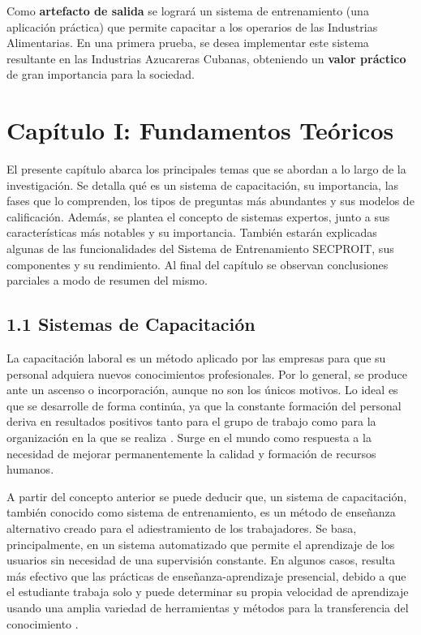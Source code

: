 \documentclass[12pt,a4paper]{report}
\begin{document}
Como \textbf{artefacto de salida} se logrará un sistema de entrenamiento (una aplicación práctica) que permite capacitar a los operarios de las Industrias Alimentarias. En una primera prueba, se desea implementar este sistema resultante en las Industrias Azucareras Cubanas, obteniendo un \textbf{valor práctico} de gran importancia para la sociedad.

\chapter*{Capítulo I: Fundamentos Teóricos}
El presente capítulo abarca los principales temas que se abordan a lo largo de la investigación. Se detalla qué es un sistema de capacitación, su importancia, las fases que lo comprenden, los tipos de preguntas más abundantes y sus modelos de calificación. Además, se plantea el concepto de sistemas expertos, junto a sus características más notables y su importancia. También estarán explicadas algunas de las funcionalidades del Sistema de Entrenamiento SECPROIT, sus componentes y su rendimiento.
Al final del capítulo se observan conclusiones parciales a modo de resumen del mismo.

\section*{1.1 Sistemas de Capacitación}
La capacitación laboral es un método aplicado por las empresas para que su personal adquiera nuevos conocimientos profesionales. Por lo general, se produce ante un ascenso o incorporación, aunque no son los únicos motivos. Lo ideal es que se desarrolle de forma continúa, ya que la constante formación del personal deriva en resultados positivos tanto para el grupo de trabajo como para la organización en la que se realiza \cite{blogBizneo}.
Surge en el mundo como respuesta a la necesidad de mejorar permanentemente la calidad y formación de recursos humanos.

A partir del concepto anterior se puede deducir que, un sistema de capacitación, también conocido como sistema de entrenamiento, es un método de enseñanza alternativo creado para el adiestramiento de los trabajadores. Se basa, principalmente, en un sistema automatizado que permite el aprendizaje de los usuarios sin necesidad de una supervisión constante. En algunos casos, resulta más efectivo que las prácticas de enseñanza-aprendizaje presencial, debido a que el estudiante trabaja solo y puede determinar su propia velocidad de aprendizaje usando una amplia variedad de herramientas y métodos para la transferencia del conocimiento \cite{seguridadMinera}.
\end{document}
